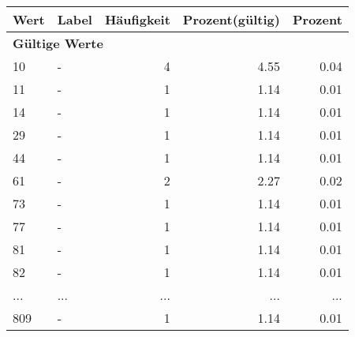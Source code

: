     \begin{longtable}{lXrrr}
     \toprule
     \textbf{Wert} & \textbf{Label} & \textbf{Häufigkeit} & \textbf{Prozent(gültig)} & \textbf{Prozent} \\
     \endhead
     \midrule
     \multicolumn{5}{l}{\textbf{Gültige Werte}}\\
        10 & \multicolumn{1}{X}{-} & %
          \num{4} &
          \num[round-mode=places,round-precision=2]{4.55} &
          \num[round-mode=places,round-precision=2]{0.04} \\
        11 & \multicolumn{1}{X}{-} & %
          \num{1} &
          \num[round-mode=places,round-precision=2]{1.14} &
          \num[round-mode=places,round-precision=2]{0.01} \\
        14 & \multicolumn{1}{X}{-} & %
          \num{1} &
          \num[round-mode=places,round-precision=2]{1.14} &
          \num[round-mode=places,round-precision=2]{0.01} \\
        29 & \multicolumn{1}{X}{-} & %
          \num{1} &
          \num[round-mode=places,round-precision=2]{1.14} &
          \num[round-mode=places,round-precision=2]{0.01} \\
        44 & \multicolumn{1}{X}{-} & %
          \num{1} &
          \num[round-mode=places,round-precision=2]{1.14} &
          \num[round-mode=places,round-precision=2]{0.01} \\
        61 & \multicolumn{1}{X}{-} & %
          \num{2} &
          \num[round-mode=places,round-precision=2]{2.27} &
          \num[round-mode=places,round-precision=2]{0.02} \\
        73 & \multicolumn{1}{X}{-} & %
          \num{1} &
          \num[round-mode=places,round-precision=2]{1.14} &
          \num[round-mode=places,round-precision=2]{0.01} \\
        77 & \multicolumn{1}{X}{-} & %
          \num{1} &
          \num[round-mode=places,round-precision=2]{1.14} &
          \num[round-mode=places,round-precision=2]{0.01} \\
        81 & \multicolumn{1}{X}{-} & %
          \num{1} &
          \num[round-mode=places,round-precision=2]{1.14} &
          \num[round-mode=places,round-precision=2]{0.01} \\
        82 & \multicolumn{1}{X}{-} & %
          \num{1} &
          \num[round-mode=places,round-precision=2]{1.14} &
          \num[round-mode=places,round-precision=2]{0.01} \\
       ... & ... & ... & ... & ... \\
        809 & \multicolumn{1}{X}{-} & %
          \num{1} &
          \num[round-mode=places,round-precision=2]{1.14} &
          \num[round-mode=places,round-precision=2]{0.01} \\


\end{longtable}
